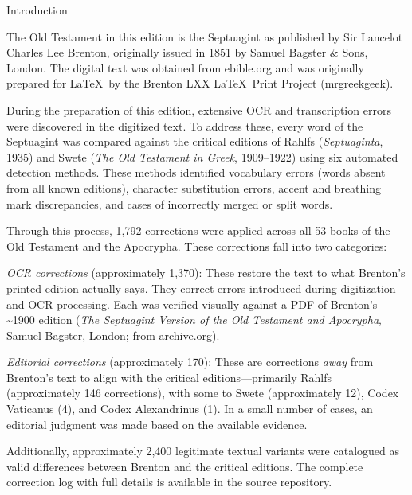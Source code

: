 \cleardoublepage
\thispagestyle{empty}
\begin{center}
  \textcolor{bookheadingcolor}{\Huge Introduction}\par
\end{center}
\vspace{2em}

\vspace{0.5em}

\noindent The Old Testament in this edition is the Septuagint as published by Sir Lancelot Charles Lee
Brenton, originally issued in 1851 by Samuel Bagster \& Sons, London. The digital text was
obtained from ebible.org and was originally prepared for \LaTeX\ by the Brenton LXX \LaTeX\
Print Project (mrgreekgeek).

During the preparation of this edition, extensive OCR and transcription errors were discovered in
the digitized text. To address these, every word of the Septuagint was compared against the
critical editions of Rahlfs (\textit{Septuaginta}, 1935) and Swete (\textit{The Old Testament
in Greek}, 1909--1922) using six automated detection methods. These methods identified vocabulary
errors (words absent from all known editions), character substitution errors, accent and
breathing mark discrepancies, and cases of incorrectly merged or split words.

Through this process, 1,792 corrections were applied across all 53 books of the Old Testament
and the Apocrypha. These corrections fall into two categories:

\textit{OCR corrections} (approximately 1,370): These restore the text to what Brenton's
printed edition actually says. They correct errors introduced during digitization and OCR
processing. Each was verified visually against a PDF of Brenton's \textasciitilde 1900 edition
(\textit{The Septuagint Version of the Old Testament and Apocrypha}, Samuel Bagster, London;
from archive.org).

\textit{Editorial corrections} (approximately 170): These are corrections \textit{away} from
Brenton's text to align with the critical editions---primarily Rahlfs (approximately 146
corrections), with some to Swete (approximately 12), Codex Vaticanus (4), and Codex Alexandrinus
(1). In a small number of cases, an editorial judgment was made based on the available evidence.

Additionally, approximately 2,400 legitimate textual variants were catalogued as valid
differences between Brenton and the critical editions. The complete correction log with full
details is available in the source repository.

